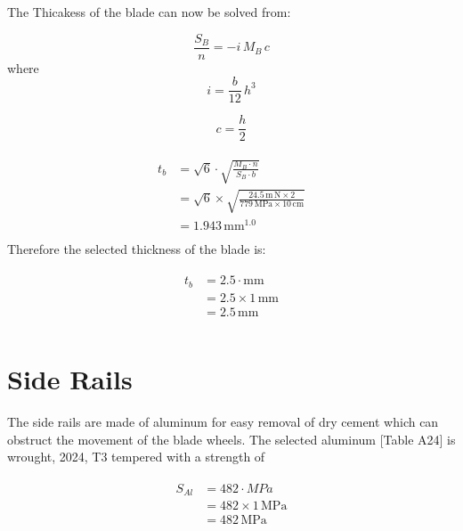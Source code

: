 \documentclass{article}
\begin{document}
The Thicakess of the blade can now be solved from:

\begin{equation}
\frac{S_{B}}{n}=- i \, M_{B} \, c
\end{equation}
where
\begin{equation}
i=\frac{b}{12} \, h^{3}
\end{equation}

\begin{equation}
c=\frac{h}{2}
\end{equation}

\begin{align}
\begin{split}
t_{b}	&= \sqrt{6} \cdot \sqrt{\frac{M_{B} \cdot n}{S_{B} \cdot b}}\\
		&= \sqrt{6} \times \sqrt{\frac{24.5\,\mathrm{m \, N} \times 2}{779\,\mathrm{MPa} \times 10\,\mathrm{cm}}}\\
		&= 1.943\,\mathrm{mm^{1.0}}\\
\end{split}
\end{align}
Therefore the selected thickness of the blade is:

\begin{align}
\begin{split}
t_{b}	&= 2.5 \cdot \mathrm{mm}\\
		&= 2.5 \times 1\,\mathrm{mm}\\
		&= 2.5\,\mathrm{mm}\\
\end{split}
\end{align}

\section{Side Rails}

The side rails are made of aluminum for easy removal of dry cement which can obstruct the movement of the blade wheels. The selected aluminum [Table A24] is wrought, 2024, T3 tempered with a strength of

\begin{align}
\begin{split}
S_{Al}	&= 482 \cdot MPa\\
		&= 482 \times 1\,\mathrm{MPa}\\
		&= 482\,\mathrm{MPa}\\
\end{split}
\end{align}
\end{document}

